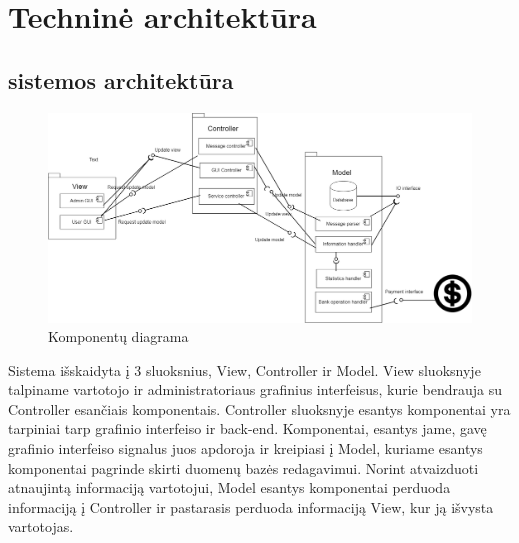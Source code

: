 \documentclass[oneside]{VUMIFPSkursinis}
\begin{document}
\section{Techninė architektūra}
\subsection{sistemos architektūra}
\begin{figure}[h]
    \centering
    \includegraphics[width=1.0\textwidth]{KomponentuDiagrama.png}
    \caption{Komponentų diagrama}
    \label{fig:KomponentuDiagrama}
\end{figure}
Sistema išskaidyta į 3 sluoksnius, View, Controller ir Model. View sluoksnyje talpiname vartotojo ir administratoriaus grafinius interfeisus, kurie bendrauja su Controller esančiais komponentais. Controller sluoksnyje esantys komponentai yra tarpiniai tarp grafinio interfeiso ir back-end. Komponentai, esantys jame, gavę grafinio interfeiso signalus juos apdoroja ir kreipiasi į Model, kuriame esantys komponentai pagrinde skirti duomenų bazės redagavimui. Norint atvaizduoti atnaujintą informaciją vartotojui, Model esantys komponentai perduoda informaciją į Controller ir pastarasis perduoda informaciją View, kur ją išvysta vartotojas.
\pagebreak
\end{document}
